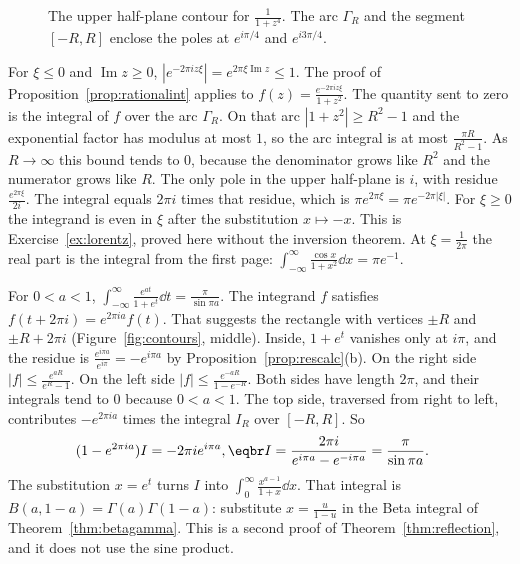 \begin{figure}[ht]
\centering
{}
\caption{The upper half-plane contour for $\frac1{1+z^4}$. The arc $\Gamma_R$ and the segment $[-R,R]$ enclose the poles at $e^{i\pi/4}$ and $e^{i3\pi/4}$.}
\label{fig:rw09-poles}
\end{figure}

\begin{example}
For $\xi\le0$ and $\operatorname{Im}z\ge0$, $|e^{-2\pi iz\xi}|=e^{2\pi\xi\operatorname{Im}z}\le1$. The proof of Proposition~\ref{prop:rationalint} applies to $f(z)=\frac{e^{-2\pi iz\xi}}{1+z^2}$. The quantity sent to zero is the integral of $f$ over the arc $\Gamma_R$. On that arc $|1+z^2|\ge R^2-1$ and the exponential factor has modulus at most $1$, so the arc integral is at most $\frac{\pi R}{R^2-1}$. As $R\to\infty$ this bound tends to $0$, because the denominator grows like $R^2$ and the numerator grows like $R$. The only pole in the upper half-plane is $i$, with residue $\frac{e^{2\pi\xi}}{2i}$. The integral equals $2\pi i$ times that residue, which is $\pi e^{2\pi\xi}=\pi e^{-2\pi|\xi|}$. For $\xi\ge0$ the integrand is even in $\xi$ after the substitution $x\mapsto -x$. This is Exercise~\ref{ex:lorentz}, proved here without the inversion theorem. At $\xi=\frac1{2\pi}$ the real part is the integral from the first page: $\int_{-\infty}^\infty\frac{\cos x}{1+x^2}\dd x=\pi e^{-1}$.
\end{example}

\begin{example}\label{ex:rectangle}
For $0<a<1$, $\displaystyle\int_{-\infty}^\infty\frac{e^{at}}{1+e^t}\dd t=\frac\pi{\sin\pi a}$. The integrand $f$ satisfies $f(t+2\pi i)=e^{2\pi ia}f(t)$. That suggests the rectangle with vertices $\pm R$ and $\pm R+2\pi i$ (Figure~\ref{fig:contours}, middle). Inside, $1+e^t$ vanishes only at $i\pi$, and the residue is $\frac{e^{i\pi a}}{e^{i\pi}}=-e^{i\pi a}$ by Proposition~\ref{prop:rescalc}(b). On the right side $|f|\le\frac{e^{aR}}{e^R-1}$. On the left side $|f|\le\frac{e^{-aR}}{1-e^{-R}}$. Both sides have length $2\pi$, and their integrals tend to $0$ because $0<a<1$. The top side, traversed from right to left, contributes $-e^{2\pi ia}$ times the integral $I_R$ over $[-R,R]$. So
\[
\begin{aligned}(1-e^{2\pi ia})I&=-2\pi ie^{i\pi a},\eqbr I=\frac{2\pi i}{e^{i\pi a}-e^{-i\pi a}}=\frac\pi{\sin\pi a}.\end{aligned}
\]
The substitution $x=e^t$ turns $I$ into $\int_0^\infty\frac{x^{a-1}}{1+x}\dd x$. That integral is $B(a,1-a)=\Gamma(a)\Gamma(1-a)$: substitute $x=\frac u{1-u}$ in the Beta integral of Theorem~\ref{thm:betagamma}. This is a second proof of Theorem~\ref{thm:reflection}, and it does not use the sine product.
\end{example}

